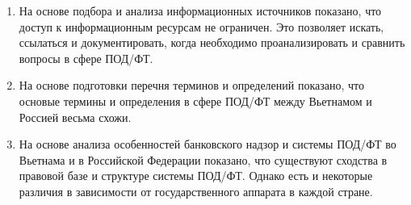 \documentclass{article}
\begin{document}
\begin{enumerate}
  \item На основе подбора и анализа информационных источников показано, что доступ к информационным ресурсам не ограничен. Это позволяет искать, ссылаться и документировать, когда необходимо проанализировать и сравнить вопросы в сфере ПОД/ФТ.
  \item На основе подготовки перечня терминов и определений показано, что основые термины и определения в сфере ПОД/ФТ между Вьетнамом и Россией весьма схожи.
  \item На основе анализа особенностей банковского надзор и системы ПОД/ФТ во Вьетнама и в Российской Федерации показано, что существуют сходства в правовой базе и структуре системы ПОД/ФТ. Однако есть и некоторые различия в зависимости от государственного аппарата в каждой стране.
\end{enumerate}

\newpage

\printbibliography[env=gostbibliography, title={Список используемых источников}]
\end{document}
